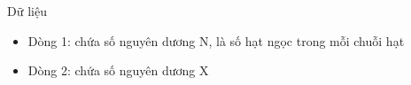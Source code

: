 Dữ liệu
\begin{itemize}
	\item     Dòng 1: chứa số nguyên dương N, là số hạt ngọc trong mỗi chuỗi hạt   
	\item     Dòng 2: chứa số nguyên dương X   
\end{itemize}